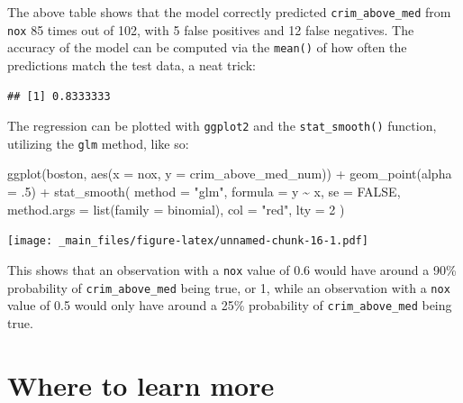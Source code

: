 \documentclass[
]{book}
\newenvironment{Shaded}{\begin{snugshade}}{\end{snugshade}}
\newcommand{\AttributeTok}[1]{\textcolor[rgb]{0.77,0.63,0.00}{#1}}
\newcommand{\ConstantTok}[1]{\textcolor[rgb]{0.00,0.00,0.00}{#1}}
\newcommand{\DecValTok}[1]{\textcolor[rgb]{0.00,0.00,0.81}{#1}}
\newcommand{\FunctionTok}[1]{\textcolor[rgb]{0.00,0.00,0.00}{#1}}
\newcommand{\NormalTok}[1]{#1}
\newcommand{\SpecialCharTok}[1]{\textcolor[rgb]{0.00,0.00,0.00}{#1}}
\newcommand{\StringTok}[1]{\textcolor[rgb]{0.31,0.60,0.02}{#1}}
\begin{document}
The above table shows that the model correctly predicted \texttt{crim\_above\_med} from \texttt{nox} 85 times out of 102, with 5 false positives and 12 false negatives. The accuracy of the model can be computed via the \texttt{mean()} of how often the predictions match the test data, a neat trick:

\begin{Shaded}
\end{Shaded}

\begin{verbatim}
## [1] 0.8333333
\end{verbatim}

The regression can be plotted with \texttt{ggplot2} and the \texttt{stat\_smooth()} function, utilizing the \texttt{glm} method, like so:

\begin{Shaded}
\begin{Highlighting}[]
\FunctionTok{ggplot}\NormalTok{(boston, }\FunctionTok{aes}\NormalTok{(}\AttributeTok{x =}\NormalTok{ nox, }\AttributeTok{y =}\NormalTok{ crim\_above\_med\_num)) }\SpecialCharTok{+}
  \FunctionTok{geom\_point}\NormalTok{(}\AttributeTok{alpha =}\NormalTok{ .}\DecValTok{5}\NormalTok{) }\SpecialCharTok{+}
  \FunctionTok{stat\_smooth}\NormalTok{(}
    \AttributeTok{method =} \StringTok{"glm"}\NormalTok{,}
    \AttributeTok{formula =}\NormalTok{ y }\SpecialCharTok{\textasciitilde{}}\NormalTok{ x,}
    \AttributeTok{se =} \ConstantTok{FALSE}\NormalTok{,}
    \AttributeTok{method.args =} \FunctionTok{list}\NormalTok{(}\AttributeTok{family =}\NormalTok{ binomial),}
    \AttributeTok{col =} \StringTok{"red"}\NormalTok{,}
    \AttributeTok{lty =} \DecValTok{2}
\NormalTok{  )}
\end{Highlighting}
\end{Shaded}

\texttt{[image: \_main\_files/figure-latex/unnamed-chunk-16-1.pdf]}

This shows that an observation with a \texttt{nox} value of 0.6 would have around a 90\% probability of \texttt{crim\_above\_med} being true, or 1, while an observation with a \texttt{nox} value of 0.5 would only have around a 25\% probability of \texttt{crim\_above\_med} being true.

\hypertarget{where-to-learn-more-2}{%
\section{Where to learn more}\label{where-to-learn-more-2}}
\end{document}
